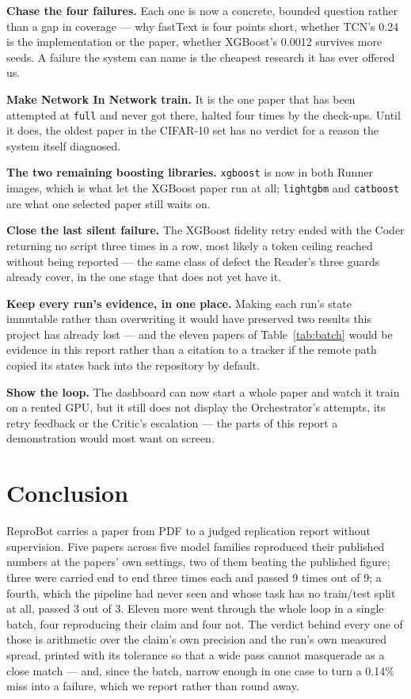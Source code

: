 \documentclass[11pt]{article}
\begin{document}
\textbf{Chase the four failures.} Each one is now a concrete, bounded question rather than a
gap in coverage --- why fastText is four points short, whether TCN's 0.24 is the implementation
or the paper, whether XGBoost's 0.0012 survives more seeds. A failure the system can name is the
cheapest research it has ever offered us.

\textbf{Make Network In Network train.} It is the one paper that has been attempted at
\texttt{full} and never got there, halted four times by the check-ups. Until it does, the oldest
paper in the CIFAR-10 set has no verdict for a reason the system itself diagnosed.

\textbf{The two remaining boosting libraries.} \texttt{xgboost} is now in both Runner images,
which is what let the XGBoost paper run at all; \texttt{lightgbm} and \texttt{catboost} are what
one selected paper still waits on.

\textbf{Close the last silent failure.} The XGBoost fidelity retry ended with the Coder returning
no script three times in a row, most likely a token ceiling reached without being reported --- the
same class of defect the Reader's three guards already cover, in the one stage that does not yet
have it.

\textbf{Keep every run's evidence, in one place.} Making each run's state immutable rather than
overwriting it would have preserved two results this project has already lost --- and the eleven
papers of Table~\ref{tab:batch} would be evidence in this report rather than a citation to a
tracker if the remote path copied its states back into the repository by default.

\textbf{Show the loop.} The dashboard can now start a whole paper and watch it train on a rented
GPU, but it still does not display the Orchestrator's attempts, its retry feedback or the
Critic's escalation --- the parts of this report a demonstration would most want on screen.

\section{Conclusion}
\label{sec:conclusion}

ReproBot carries a paper from PDF to a judged replication report without supervision. Five papers
across five model families reproduced their published numbers at the papers' own settings, two of
them beating the published figure; three were carried end to end three times each and passed 9
times out of 9; a fourth, which the pipeline had never seen and whose task has no train/test split
at all, passed 3 out of 3. Eleven more went through the whole loop in a single batch, four
reproducing their claim and four not. The verdict behind every one of those is arithmetic over the
claim's own precision and the run's own measured spread, printed with its tolerance so that a wide
pass cannot masquerade as a close match --- and, since the batch, narrow enough in one case to
turn a 0.14\% miss into a failure, which we report rather than round away.
\end{document}
